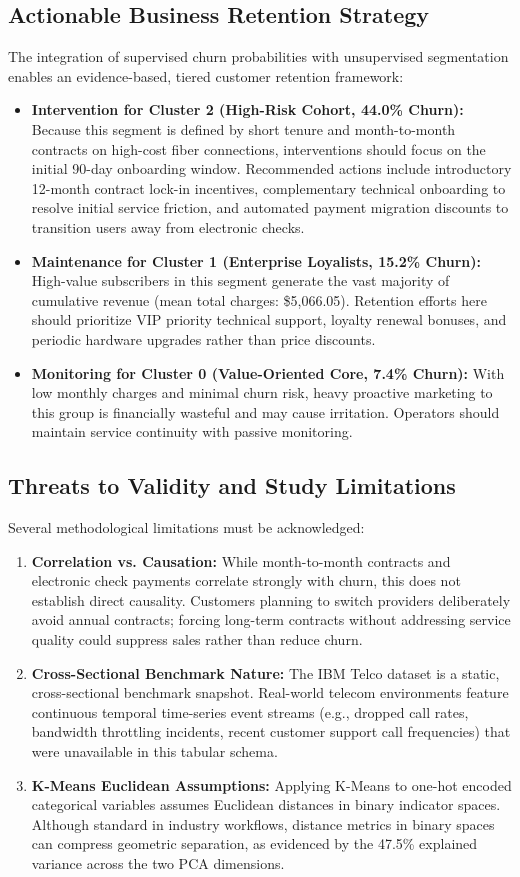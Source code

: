 \documentclass[12pt,a4paper]{report}
\begin{document}
\subsection{Actionable Business Retention Strategy}
The integration of supervised churn probabilities with unsupervised segmentation enables an evidence-based, tiered customer retention framework:
\begin{itemize}
    \item \textbf{Intervention for Cluster 2 (High-Risk Cohort, 44.0\% Churn):} Because this segment is defined by short tenure and month-to-month contracts on high-cost fiber connections, interventions should focus on the initial 90-day onboarding window. Recommended actions include introductory 12-month contract lock-in incentives, complementary technical onboarding to resolve initial service friction, and automated payment migration discounts to transition users away from electronic checks.
    \item \textbf{Maintenance for Cluster 1 (Enterprise Loyalists, 15.2\% Churn):} High-value subscribers in this segment generate the vast majority of cumulative revenue (mean total charges: \$5,066.05). Retention efforts here should prioritize VIP priority technical support, loyalty renewal bonuses, and periodic hardware upgrades rather than price discounts.
    \item \textbf{Monitoring for Cluster 0 (Value-Oriented Core, 7.4\% Churn):} With low monthly charges and minimal churn risk, heavy proactive marketing to this group is financially wasteful and may cause irritation. Operators should maintain service continuity with passive monitoring.
\end{itemize}

\subsection{Threats to Validity and Study Limitations}
Several methodological limitations must be acknowledged:
\begin{enumerate}
    \item \textbf{Correlation vs. Causation:} While month-to-month contracts and electronic check payments correlate strongly with churn, this does not establish direct causality. Customers planning to switch providers deliberately avoid annual contracts; forcing long-term contracts without addressing service quality could suppress sales rather than reduce churn.
    \item \textbf{Cross-Sectional Benchmark Nature:} The IBM Telco dataset is a static, cross-sectional benchmark snapshot. Real-world telecom environments feature continuous temporal time-series event streams (e.g., dropped call rates, bandwidth throttling incidents, recent customer support call frequencies) that were unavailable in this tabular schema.
    \item \textbf{K-Means Euclidean Assumptions:} Applying K-Means to one-hot encoded categorical variables assumes Euclidean distances in binary indicator spaces. Although standard in industry workflows, distance metrics in binary spaces can compress geometric separation, as evidenced by the 47.5\% explained variance across the two PCA dimensions.
\end{enumerate}
\end{document}
